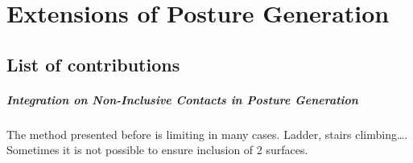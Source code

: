 

\chapter{Extensions of Posture Generation}
\label{cha:extensions_of_posture_generation}

\section{List of contributions}
\paragraph{Integration on Non-Inclusive Contacts in Posture Generation}

The method presented before is limiting in many cases. Ladder, stairs climbing\dots.
Sometimes it is not possible to ensure inclusion of 2 surfaces.

